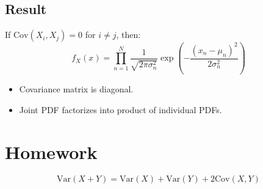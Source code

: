 \documentclass[11pt]{article}
\begin{document}
\subsection{Result}
If $\text{Cov}(X_i, X_j) = 0$ for $i \neq j$, then:
\[
f_X(x) = \prod_{n=1}^{N}
\frac{1}{\sqrt{2\pi\sigma_n^2}}
\exp\left(-\frac{(x_n-\mu_n)^2}{2\sigma_n^2}\right)
\]

\begin{itemize}
\item Covariance matrix is diagonal.
\item Joint PDF factorizes into product of individual PDFs.
\end{itemize}

\section{Homework}

\[
\text{Var}(X+Y) = \text{Var}(X) + \text{Var}(Y) + 2\text{Cov}(X,Y)
\]
\end{document}
